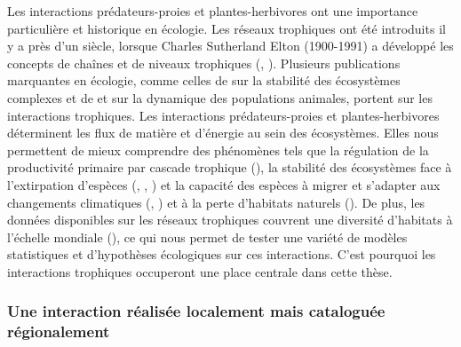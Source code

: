Les interactions prédateurs-proies et plantes-herbivores ont une importance
particulière et historique en écologie. Les réseaux trophiques ont été
introduits il y a près d'un siècle, lorsque Charles Sutherland Elton (1900-1991)
a développé les concepts de chaînes et de niveaux trophiques
(\cite{Elton1927Animal}, \cite{Elton1958Ecology}). Plusieurs publications
marquantes en écologie, comme celles de \cite{May1972Will} sur la stabilité des
écosystèmes complexes et de \cite{Lotka1925Elements} et
\cite{Volterra1927Fluctuations} sur la dynamique des populations animales,
portent sur les interactions trophiques. Les interactions prédateurs-proies et
plantes-herbivores déterminent les flux de matière et d'énergie au sein des
écosystèmes. Elles nous permettent de mieux comprendre des phénomènes tels que
la régulation de la productivité primaire par cascade trophique
(\cite{Carpenter1987Regulation}), la stabilité des écosystèmes face à
l'extirpation d'espèces (\cite{Dunne2002Network}, \cite{Srinivasan2007Response},
\cite{Staniczenko2010Structural}) et la capacité des espèces à migrer et
s'adapter aux changements climatiques (\cite{Tylianakis2008Global},
\cite{Gilman2010Framework}) et à la perte d'habitats naturels
(\cite{Evans2013Robustness}). De plus, les données disponibles sur les réseaux
trophiques couvrent une diversité d'habitats à l'échelle mondiale
(\cite{Poisot2021Global}), ce qui nous permet de tester une variété de modèles
statistiques et d'hypothèses écologiques sur ces interactions. C'est pourquoi
les interactions trophiques occuperont une place centrale dans cette thèse.

\subsubsection{Une interaction réalisée localement mais cataloguée régionalement} 

